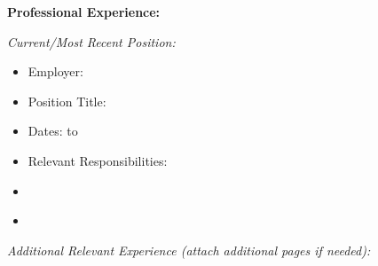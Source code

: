 \documentclass[11pt,a4paper]{article}
\begin{document}
\textbf{Professional Experience:}

\textit{Current/Most Recent Position:}
\begin{itemize}
\item Employer: \underline{\hspace{10cm}}
\item Position Title: \underline{\hspace{10cm}}
\item Dates: \underline{\hspace{3cm}} to \underline{\hspace{3cm}}
\item Relevant Responsibilities: \underline{\hspace{10cm}}
\item \underline{\hspace{12cm}}
\item \underline{\hspace{12cm}}
\end{itemize}

\textit{Additional Relevant Experience (attach additional pages if needed):}
\end{document}
